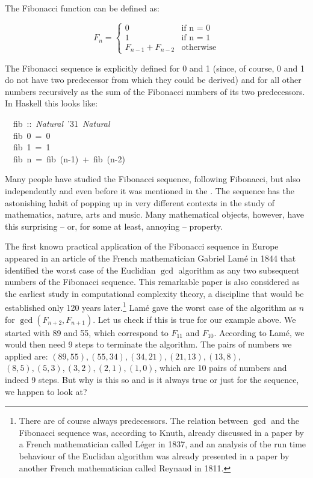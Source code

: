 \documentclass{scrreprt}
\newcommand{\texfamily}{\fontfamily{cmtex}\selectfont}
\begin{document}
The Fibonacci function can be defined as:

\[
F_n = \begin{cases}
        0 & \textrm{if n = 0}\\
        1 & \textrm{if n = 1}\\
        F_{n-1} + F_{n-2} & \textrm{otherwise}
      \end{cases}
\]

The Fibonacci sequence
is explicitly defined for 0 and 1
(since, of course, 0 and 1 do not have
two predecessor from which they could be derived)
and for all other numbers recursively as
the sum of the Fibonacci numbers
of its two predecessors.
In Haskell this looks like:

\begin{tabbing}\texfamily
~~fib~::~{\itshape Natural}~\char'31~{\itshape Natural}\\
\texfamily ~~fib~0~=~0\\
\texfamily ~~fib~1~=~1\\
\texfamily ~~fib~n~=~fib~(n-1)~+~fib~(n-2)
\end{tabbing}

Many people have studied the Fibonacci sequence,
following Fibonacci,
but also independently 
and even before it was mentioned in the .
The sequence has the astonishing habit
of popping up in very different contexts
in the study of mathematics, nature, arts and music.
Many mathematical objects, however, have
this surprising -- or, for some at least, annoying --
property.

The first known practical application of the Fibonacci sequence
in Europe appeared in an article of the French mathematician
Gabriel Lamé in 1844 that identified the worst case
of the Euclidian $\gcd$ algorithm as any two subsequent numbers
of the Fibonacci sequence.
This remarkable paper is also considered as the earliest
study in computational complexity theory,
a discipline that would be established only 120 years later.\footnote{
There are of course always predecessors.
The relation between $\gcd$ and the Fibonacci sequence
was, according to Knuth, already discussed in a paper 
by a French mathematician called Léger in 1837,
and an analysis of the run time behaviour 
of the Euclidan algorithm
was already presented in a paper by another French mathematician
called Reynaud in 1811.}
Lamé gave the worst case of the algorithm as $n$
for $\gcd(F_{n+2}, F_{n+1})$.
Let us check if this is true for our example above.
We started with 89 and 55, which correspond
to $F_{11}$ and $F_{10}$.
According to Lamé, we would then need 9 steps
to terminate the algorithm.
The pairs of numbers we applied are:
$(89,55),(55,34),(34,21),(21,13),(13,8),$
$(8,5),(5,3),(3,2),(2,1),(1,0)$,
which are 10 pairs of numbers and indeed 9 steps.
But why is this so and is it always true
or just for the sequence, we happen to look at?
\end{document}
